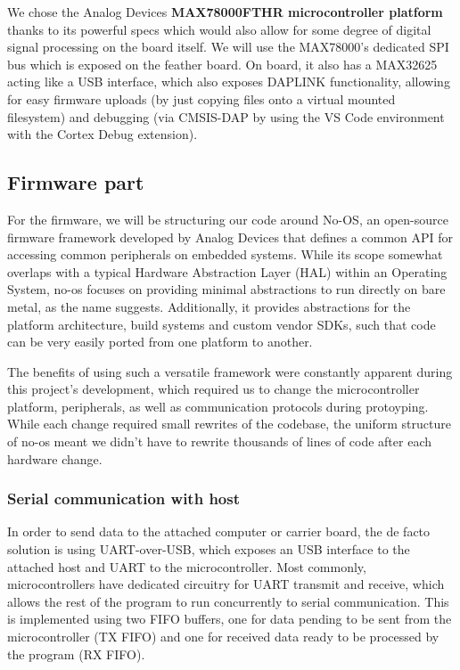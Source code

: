 \documentclass{thesis}
\begin{document}
We chose the Analog Devices \textbf{MAX78000FTHR microcontroller platform} thanks to its powerful specs which would also allow for some degree of digital signal processing on the board itself. We will use the MAX78000's dedicated SPI bus which is exposed on the feather board. On board, it also has a MAX32625 acting like a USB interface, which also exposes DAPLINK functionality, allowing for easy firmware uploads (by just copying files onto a virtual mounted filesystem) and debugging (via CMSIS-DAP by using the VS Code environment with the Cortex Debug extension).

\newpage
\subsection{Firmware part}

For the firmware, we will be structuring our code around No-OS\cite{noos}, an open-source firmware framework developed by Analog Devices that defines a common API for accessing common peripherals on embedded systems. While its scope somewhat overlaps with a typical Hardware Abstraction Layer (HAL) within an Operating System, no-os focuses on providing minimal abstractions to run directly on bare metal, as the name suggests. Additionally, it provides abstractions for the platform architecture, build systems and custom vendor SDKs, such that code can be very easily ported from one platform to another.

The benefits of using such a versatile framework were constantly apparent during this project's development, which required us to change the microcontroller platform, peripherals, as well as communication protocols during protoyping. While each change required small rewrites of the codebase, the uniform structure of no-os meant we didn't have to rewrite thousands of lines of code after each hardware change.

\subsubsection{Serial communication with host}

In order to send data to the attached computer or carrier board, the de facto solution is using UART-over-USB, which exposes an USB interface to the attached host and UART to the microcontroller. Most commonly, microcontrollers have dedicated circuitry for UART transmit and receive, which allows the rest of the program to run concurrently to serial communication. This is implemented using two FIFO buffers, one for data pending to be sent from the microcontroller (TX FIFO) and one for received data ready to be processed by the program (RX FIFO).
\end{document}
